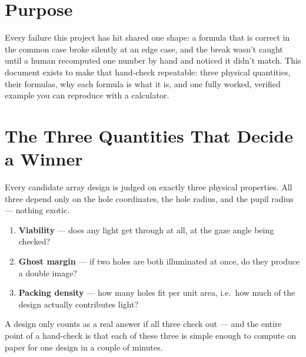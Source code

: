 \section{Purpose}

Every failure this project has hit shared one shape: a formula that is correct
in the common case broke silently at an edge case, and the break wasn't caught
until a human recomputed one number by hand and noticed it didn't match. This
document exists to make that hand-check repeatable: three physical quantities,
their formulas, why each formula is what it is, and one fully worked, verified
example you can reproduce with a calculator.

\section{The Three Quantities That Decide a Winner}

Every candidate array design is judged on exactly three physical properties.
All three depend only on the hole coordinates, the hole radius, and the pupil
radius --- nothing exotic.

\begin{enumerate}
  \item \textbf{Viability} --- does any light get through at all, at the
  gaze angle being checked?
  \item \textbf{Ghost margin} --- if two holes are both illuminated at once,
  do they produce a double image?
  \item \textbf{Packing density} --- how many holes fit per unit area, i.e.\
  how much of the design actually contributes light?
\end{enumerate}

A design only counts as a real answer if all three check out --- and the
entire point of a hand-check is that each of these three is simple enough to
compute on paper for one design in a couple of minutes.

\newpage

